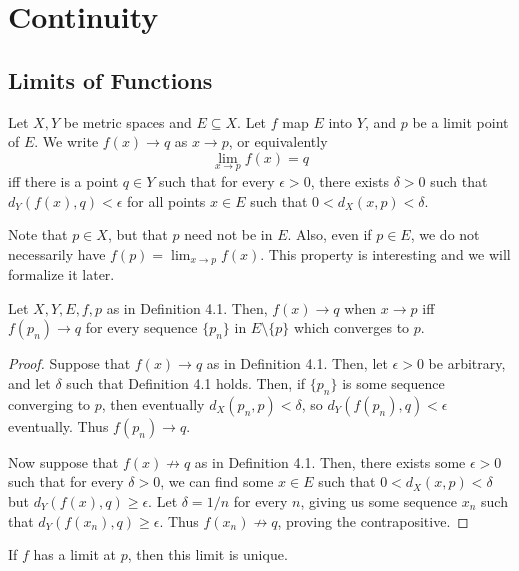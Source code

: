 
\chapter{Continuity}

\section{Limits of Functions}

\begin{definition} %
    Let $X, Y$ be metric spaces and $E \subseteq X$. Let $f$ map $E$ into $Y$, and $p$ be a limit point of $E$. We write $f(x) \to q$ as $x \to p$, or equivalently
    \[
        \lim_{x \to p}f(x) = q
    \]
    iff there is a point $q \in Y$ such that for every $\epsilon > 0$, there exists $\delta > 0$ such that $d_Y(f(x), q) < \epsilon$ for all points $x \in E$ such that $0 < d_X(x, p) < \delta$.

    Note that $p \in X$, but that $p$ need not be in $E$. Also, even if $p \in E$, we do not necessarily have $f(p) = \lim_{x \to p} f(x)$. This property is interesting and we will formalize it later.
\end{definition}

\begin{theorem} %
    Let $X, Y, E, f, p$ as in Definition 4.1. Then, $f(x) \to q$ when $x \to p$ iff $f(p_n) \to q$ for every sequence $\{p_n\}$ in $E \setminus \{p\}$ which converges to $p$.
\begin{proof}
    Suppose that $f(x) \to q$ as in Definition 4.1. Then, let $\epsilon > 0$ be arbitrary, and let $\delta$ such that Definition 4.1 holds. Then, if $\{p_n\}$ is some sequence converging to $p$, then eventually $d_X(p_n, p) < \delta$, so $d_Y(f(p_n), q) < \epsilon$ eventually. Thus $f(p_n) \to q$.

    Now suppose that $f(x) \not\to q$ as in Definition 4.1. Then, there exists some $\epsilon > 0$ such that for every $\delta > 0$, we can find some $x \in E$ such that $0 < d_X(x, p) < \delta$ but $d_Y(f(x), q) \ge \epsilon$. Let $\delta = 1/n$ for every $n$, giving us some sequence $x_n$ such that $d_Y(f(x_n), q) \ge \epsilon$. Thus $f(x_n) \not\to q$, proving the contrapositive.    
\end{proof}
\end{theorem}

\begin{corollary} %
    If $f$ has a limit at $p$, then this limit is unique.
\end{corollary}

